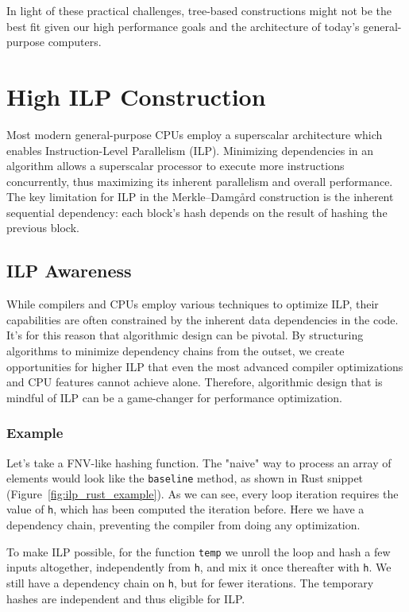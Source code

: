 \documentclass[10pt]{article}
\begin{document}
In light of these practical challenges, tree-based constructions might not be the best fit given our high performance goals and the architecture of today's general-purpose computers.

\clearpage
\section{High ILP Construction} \label{highilp}

Most modern general-purpose CPUs employ a superscalar architecture which enables Instruction-Level Parallelism (ILP). 
Minimizing dependencies in an algorithm allows a superscalar processor to execute more instructions concurrently, thus maximizing its inherent parallelism and overall performance.
The key limitation for ILP in the Merkle–Damgård construction is the inherent sequential dependency: each block's hash depends on the result of hashing the previous block.

\subsection{ILP Awareness}

While compilers and CPUs employ various techniques to optimize ILP, their capabilities are often constrained by the inherent data dependencies in the code. It's for this reason that algorithmic design can be pivotal. By structuring algorithms to minimize dependency chains from the outset, we create opportunities for higher ILP that even the most advanced compiler optimizations and CPU features cannot achieve alone. Therefore, algorithmic design that is mindful of ILP can be a game-changer for performance optimization.

\subsubsection{Example}
Let's take a FNV-like hashing function. The "naive" way to process an array of elements would look like the \texttt{baseline} method, as shown in Rust snippet (Figure~\ref{fig:ilp_rust_example}). As we can see, every loop iteration requires the value of \texttt{h}, which has been computed the iteration before. Here we have a dependency chain, preventing the compiler from doing any optimization.

To make ILP possible, for the function \texttt{temp} we unroll the loop and hash a few inputs altogether, independently from \texttt{h}, and mix it once thereafter with \texttt{h}. We still have a dependency chain on \texttt{h}, but for fewer iterations.
The temporary hashes are independent and thus eligible for ILP.
\end{document}
